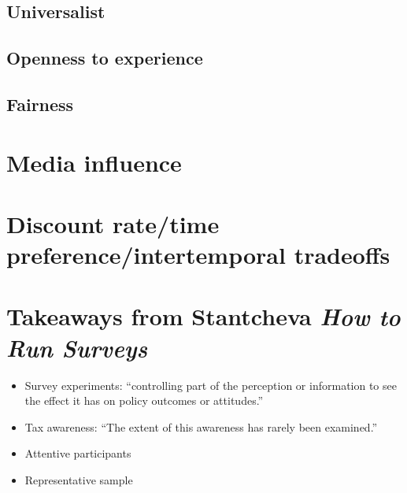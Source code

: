 \documentclass[12pt]{article}
\begin{document}
    \subsection{Universalist}

    \subsection{Openness to experience}

    \subsection{Fairness}

        \cite{stantcheva2021understanding}

\section{Media influence}

\section{Discount rate/time preference/intertemporal tradeoffs}

\section{Takeaways from Stantcheva \textit{How to Run Surveys}}

\begin{itemize}
    \item Survey experiments: ``controlling part of the perception or information to see the effect it has on policy outcomes or attitudes.''
    \item Tax awareness: ``The extent of this awareness has rarely been examined.''
    \item Attentive participants
    \item Representative sample
    
\end{itemize}

\newpage


\end{document}
